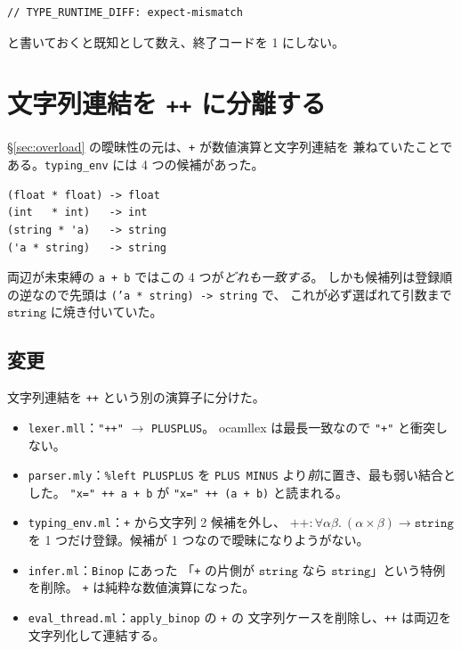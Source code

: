\documentclass[11pt,a4paper]{ltjsarticle}
\theoremstyle{definition}
\theoremstyle{remark}
\newcommand{\ty}[1]{\ensuremath{\mathtt{#1}}}
\begin{document}
\begin{lstlisting}[language={}]
// TYPE_RUNTIME_DIFF: expect-mismatch
\end{lstlisting}

と書いておくと既知として数え、終了コードを 1 にしない。

\section{文字列連結を \texttt{++} に分離する}
\label{sec:concat}

\S\ref{sec:overload} の曖昧性の元は、\texttt{+} が数値演算と文字列連結を
兼ねていたことである。\texttt{typing\_env} には 4 つの候補があった。

\begin{lstlisting}[language={}]
(float * float) -> float
(int   * int)   -> int
(string * 'a)   -> string
('a * string)   -> string
\end{lstlisting}

両辺が未束縛の \texttt{a + b} ではこの 4 つが\emph{どれも一致する}。
しかも候補列は登録順の逆なので先頭は \texttt{('a * string) -> string} で、
これが必ず選ばれて引数まで \ty{string} に焼き付いていた。

\subsection{変更}

文字列連結を \texttt{++} という別の演算子に分けた。

\begin{itemize}
\item \texttt{lexer.mll}：\texttt{"++"} $\to$ \texttt{PLUSPLUS}。
  ocamllex は最長一致なので \texttt{"+"} と衝突しない。
\item \texttt{parser.mly}：\texttt{\%left PLUSPLUS} を \texttt{PLUS MINUS}
  より\emph{前}に置き、最も弱い結合とした。
  \texttt{"x=" ++ a + b} が \texttt{"x=" ++ (a + b)} と読まれる。
\item \texttt{typing\_env.ml}：\texttt{+} から文字列 2 候補を外し、
  $\texttt{++} : \forall \alpha\beta.\ (\alpha \times \beta) \to \ty{string}$
  を 1 つだけ登録。候補が 1 つなので曖昧になりようがない。
\item \texttt{infer.ml}：\texttt{Binop} にあった
  「\texttt{+} の片側が \ty{string} なら \ty{string}」という特例を削除。
  \texttt{+} は純粋な数値演算になった。
\item \texttt{eval\_thread.ml}：\texttt{apply\_binop} の \texttt{+} の
  文字列ケースを削除し、\texttt{++} は両辺を文字列化して連結する。
\end{itemize}
\end{document}
